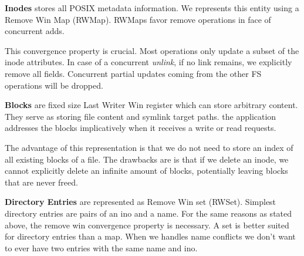 \documentclass[sigplan, 10pt]{acmart}
\begin{document}
\textbf{Inodes} stores all POSIX metadata information.
We represents this entity using a Remove Win Map (RWMap). \linebreak RWMaps favor remove operations in face
of concurrent adds.

This convergence property is crucial. Most operations only update a subset of
the inode attributes. In case of a concurrent \textit{unlink},
if no link remains, we explicitly remove all fields. Concurrent partial updates
coming from the other FS operations will be dropped.

\textbf{Blocks} are fixed size Last Writer Win register which can store
arbitrary content. They serve as storing file content and
symlink target paths. the application addresses the blocks implicatively when it receives
a write or read requests.

The advantage of this representation is that we do not
need to store an index of all existing blocks of a file.
The drawbacks are is that if we delete an inode,
we cannot explicitly delete an infinite amount of blocks, potentially leaving
blocks that are never freed.

\textbf{Directory Entries} are represented as Remove Win set (RWSet). Simplest directory
entries are pairs of an ino and a name.
For the same reasons as stated above, the remove win convergence property
is necessary. A set is better suited for directory entries than a map.
When we handles name conflicts we don't want to ever have two entries with
the same name and ino.





\end{document}
